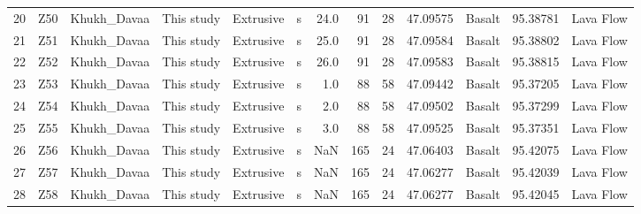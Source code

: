 \documentclass[11pt]{article}
\begin{document}
\begin{sidewaystable}
{\begin{tabular}{llllllrrrrlrl}
20 &          Z50 &      Khukh\_Davaa &        This study &  Extrusive &               s &       24.0 &                        91 &              28 &  47.09575 &         Basalt &  95.38781 &  Lava Flow \\
21 &          Z51 &      Khukh\_Davaa &        This study &  Extrusive &               s &       25.0 &                        91 &              28 &  47.09584 &         Basalt &  95.38802 &  Lava Flow \\
22 &          Z52 &      Khukh\_Davaa &        This study &  Extrusive &               s &       26.0 &                        91 &              28 &  47.09583 &         Basalt &  95.38815 &  Lava Flow \\
23 &          Z53 &      Khukh\_Davaa &        This study &  Extrusive &               s &        1.0 &                        88 &              58 &  47.09442 &         Basalt &  95.37205 &  Lava Flow \\
24 &          Z54 &      Khukh\_Davaa &        This study &  Extrusive &               s &        2.0 &                        88 &              58 &  47.09502 &         Basalt &  95.37299 &  Lava Flow \\
25 &          Z55 &      Khukh\_Davaa &        This study &  Extrusive &               s &        3.0 &                        88 &              58 &  47.09525 &         Basalt &  95.37351 &  Lava Flow \\
26 &          Z56 &      Khukh\_Davaa &        This study &  Extrusive &               s &        NaN &                       165 &              24 &  47.06403 &         Basalt &  95.42075 &  Lava Flow \\
27 &          Z57 &      Khukh\_Davaa &        This study &  Extrusive &               s &        NaN &                       165 &              24 &  47.06277 &         Basalt &  95.42039 &  Lava Flow \\
28 &          Z58 &      Khukh\_Davaa &        This study &  Extrusive &               s &        NaN &                       165 &              24 &  47.06277 &         Basalt &  95.42045 &  Lava Flow \\
\bottomrule
\end{tabular}}
\end{sidewaystable}
    


    \begin{center}
    \end{center}
    { \hspace*{\fill} \\}
    
\end{document}
